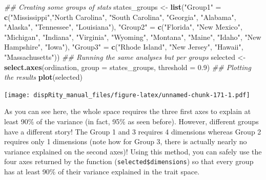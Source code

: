 \documentclass[
]{book}
\newenvironment{Shaded}{\begin{snugshade}}{\end{snugshade}}
\newcommand{\CommentTok}[1]{\textcolor[rgb]{0.56,0.35,0.01}{\textit{#1}}}
\newcommand{\DataTypeTok}[1]{\textcolor[rgb]{0.13,0.29,0.53}{#1}}
\newcommand{\FloatTok}[1]{\textcolor[rgb]{0.00,0.00,0.81}{#1}}
\newcommand{\KeywordTok}[1]{\textcolor[rgb]{0.13,0.29,0.53}{\textbf{#1}}}
\newcommand{\NormalTok}[1]{#1}
\newcommand{\StringTok}[1]{\textcolor[rgb]{0.31,0.60,0.02}{#1}}
\begin{document}
\begin{Shaded}
\begin{Highlighting}[]
\CommentTok{\#\# Creating some groups of stats}
\NormalTok{states\_groups \textless{}{-}}\StringTok{ }\KeywordTok{list}\NormalTok{(}\StringTok{"Group1"}\NormalTok{ =}\StringTok{ }\KeywordTok{c}\NormalTok{(}\StringTok{"Mississippi"}\NormalTok{,}\StringTok{"North Carolina"}\NormalTok{,}
                                   \StringTok{"South Carolina"}\NormalTok{, }\StringTok{"Georgia"}\NormalTok{, }\StringTok{"Alabama"}\NormalTok{,}
                                   \StringTok{"Alaska"}\NormalTok{, }\StringTok{"Tennessee"}\NormalTok{, }\StringTok{"Louisiana"}\NormalTok{),}
                      \StringTok{"Group2"}\NormalTok{ =}\StringTok{ }\KeywordTok{c}\NormalTok{(}\StringTok{"Florida"}\NormalTok{, }\StringTok{"New Mexico"}\NormalTok{, }\StringTok{"Michigan"}\NormalTok{,}
                                   \StringTok{"Indiana"}\NormalTok{, }\StringTok{"Virginia"}\NormalTok{, }\StringTok{"Wyoming"}\NormalTok{, }\StringTok{"Montana"}\NormalTok{,}
                                   \StringTok{"Maine"}\NormalTok{, }\StringTok{"Idaho"}\NormalTok{, }\StringTok{"New Hampshire"}\NormalTok{, }\StringTok{"Iowa"}\NormalTok{),}
                      \StringTok{"Group3"}\NormalTok{ =}\StringTok{ }\KeywordTok{c}\NormalTok{(}\StringTok{"Rhode Island"}\NormalTok{, }\StringTok{"New Jersey"}\NormalTok{, }\StringTok{"Hawaii"}\NormalTok{, }\StringTok{"Massachusetts"}\NormalTok{))}
\CommentTok{\#\# Running the same analyses but per groups}
\NormalTok{selected \textless{}{-}}\StringTok{ }\KeywordTok{select.axes}\NormalTok{(ordination, }\DataTypeTok{group =}\NormalTok{ states\_groups, }\DataTypeTok{threshold =} \FloatTok{0.9}\NormalTok{)}
\CommentTok{\#\# Plotting the results}
\KeywordTok{plot}\NormalTok{(selected)}
\end{Highlighting}
\end{Shaded}

\texttt{[image: dispRity\_manual\_files/figure-latex/unnamed-chunk-171-1.pdf]}

As you can see here, the whole space requires the three first axes to explain at least 90\% of the variance (in fact, 95\% as seen before).
However, different groups have a different story!
The Group 1 and 3 requires 4 dimensions whereas Group 2 requires only 1 dimensions (note how for Group 3, there is actually nearly no variance explained on the second axes)!
Using this method, you can safely use the four axes returned by the function (\texttt{selected\$dimensions}) so that every group has at least 90\% of their variance explained in the trait space.
\end{document}
